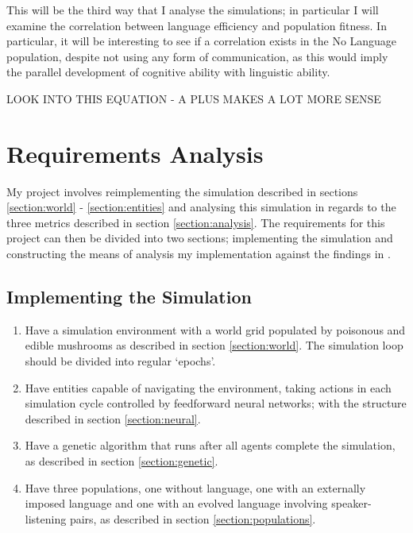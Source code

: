 \documentclass[12pt,a4paper,twoside,openright]{report}
\begin{document}
This will be the third way that I analyse the simulations; in particular I will examine the correlation between language efficiency and population fitness. In particular, it will be interesting to see if a correlation exists in the No Language population, despite not using any form of communication, as this would imply the parallel development of cognitive ability with linguistic ability.

LOOK INTO THIS EQUATION - A PLUS MAKES A LOT MORE SENSE

\section{Requirements Analysis}\label{section:requirements}

My project involves reimplementing the simulation described in sections \ref{section:world} - \ref{section:entities} and analysing this simulation in regards to the three metrics described in section \ref{section:analysis}. The requirements for this project can then be divided into two sections; implementing the simulation and constructing the means of analysis my implementation against the findings in \citet{Cangelosi1998}.

\subsection*{Implementing the Simulation}

\begin{enumerate}

\item Have a simulation environment with a world grid populated by poisonous and edible mushrooms as described in section \ref{section:world}. The simulation loop should be divided into regular `epochs'.

\item Have entities capable of navigating the environment, taking actions in each simulation cycle controlled by feedforward neural networks; with the structure described in section \ref{section:neural}.

\item Have a genetic algorithm that runs after all agents complete the simulation, as described in section \ref{section:genetic}.

\item Have three populations, one without language, one with an externally imposed language and one with an evolved language involving speaker-listening pairs, as described in section \ref{section:populations}.

\end{enumerate}
\end{document}
